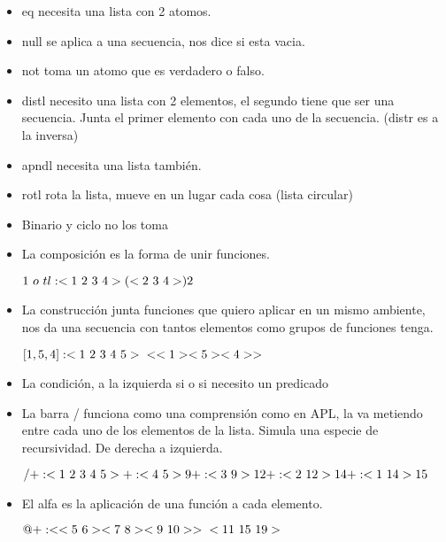 \begin{itemize}
\item eq necesita una lista con 2 atomos.
\item null se aplica a una secuencia, nos dice si esta vacia.
\item not toma un atomo que es verdadero o falso.
\item distl necesito una lista con 2 elementos, el segundo tiene que ser una secuencia. Junta el primer elemento con cada uno de la secuencia. (distr es a la inversa)
\item apndl necesita una lista también.
\item rotl rota la lista, mueve en un lugar cada cosa (lista circular)
\item Binario y ciclo no los toma
\item La composición es la forma de unir funciones.

$
1\ o\ tl : <1\ 2\ 3\ 4>\\
(<2\ 3\ 4>)\\
2
$

\item La construcción junta funciones que quiero aplicar en un mismo ambiente, nos da una secuencia con tantos elementos como grupos de funciones tenga.

$
[ 1, 5 ,4 ] : <1\ 2\ 3\ 4\ 5>\\
< <1> <5> <4> >
$

\item La condición, a la izquierda si o si necesito un predicado
\item La barra / funciona como una comprensión como en APL, la va metiendo entre cada uno de los elementos de la lista. Simula una especie de recursividad. De derecha a izquierda.

$
/+ : <1\ 2\ 3\ 4\ 5>\\
+  : <4\ 5>\\
9\\
+: <3\ 9>\\
12\\
+:<2\ 12>\\
14\\
+:<1\ 14>\\
15
$

\item El alfa es la aplicación de una función a cada elemento.

$
@+: < <5\ 6> <7\ 8> <9\ 10> >\\
<11\ 15\ 19>
$

\end{itemize}

